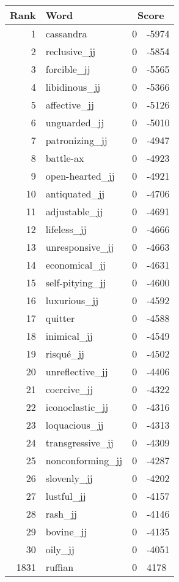\begin{longtable}[!htbp]{| rlr@{.}l |}
    \hline
    \textbf{Rank} & \textbf{Word} & \multicolumn{2}{c|}{\textbf{Score}} \\
    \hline
    \endhead
    1 & cassandra & 0 & -5974 \\
    2 & reclusive\_jj & 0 & -5854 \\
    3 & forcible\_jj & 0 & -5565 \\
    4 & libidinous\_jj & 0 & -5366 \\
    5 & affective\_jj & 0 & -5126 \\
    6 & unguarded\_jj & 0 & -5010 \\
    7 & patronizing\_jj & 0 & -4947 \\
    8 & battle-ax & 0 & -4923 \\
    9 & open-hearted\_jj & 0 & -4921 \\
    10 & antiquated\_jj & 0 & -4706 \\
    11 & adjustable\_jj & 0 & -4691 \\
    12 & lifeless\_jj & 0 & -4666 \\
    13 & unresponsive\_jj & 0 & -4663 \\
    14 & economical\_jj & 0 & -4631 \\
    15 & self-pitying\_jj & 0 & -4600 \\
    16 & luxurious\_jj & 0 & -4592 \\
    17 & quitter & 0 & -4588 \\
    18 & inimical\_jj & 0 & -4549 \\
    19 & risqué\_jj & 0 & -4502 \\
    20 & unreflective\_jj & 0 & -4406 \\
    21 & coercive\_jj & 0 & -4322 \\
    22 & iconoclastic\_jj & 0 & -4316 \\
    23 & loquacious\_jj & 0 & -4313 \\
    24 & transgressive\_jj & 0 & -4309 \\
    25 & nonconforming\_jj & 0 & -4287 \\
    26 & slovenly\_jj & 0 & -4202 \\
    27 & lustful\_jj & 0 & -4157 \\
    28 & rash\_jj & 0 & -4146 \\
    29 & bovine\_jj & 0 & -4135 \\
    30 & oily\_jj & 0 & -4051 \\
    1831 & ruffian & 0 & 4178 \\

\end{longtable}
